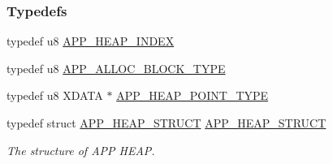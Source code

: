 \subsubsection*{Typedefs}
\begin{DoxyCompactItemize}
\item 
typedef u8 \hyperlink{group___h_e_a_p_gac92ab72831cd0fc218a7529be207c778}{A\+P\+P\+\_\+\+H\+E\+A\+P\+\_\+\+I\+N\+D\+EX}
\item 
typedef u8 \hyperlink{group___h_e_a_p_ga2b37dbe3b78e682f59bb6d1aeb58f508}{A\+P\+P\+\_\+\+A\+L\+L\+O\+C\+\_\+\+B\+L\+O\+C\+K\+\_\+\+T\+Y\+PE}
\item 
typedef u8 X\+D\+A\+TA $\ast$ \hyperlink{group___h_e_a_p_gac8090ae7433e9fda501dd91e26c7f66e}{A\+P\+P\+\_\+\+H\+E\+A\+P\+\_\+\+P\+O\+I\+N\+T\+\_\+\+T\+Y\+PE}
\item 
typedef struct \hyperlink{struct_a_p_p___h_e_a_p___s_t_r_u_c_t}{A\+P\+P\+\_\+\+H\+E\+A\+P\+\_\+\+S\+T\+R\+U\+CT} \hyperlink{group___h_e_a_p_gab1b2f6211e41b3cfd2b3a270afa198f1}{A\+P\+P\+\_\+\+H\+E\+A\+P\+\_\+\+S\+T\+R\+U\+CT}\hypertarget{group___h_e_a_p_gab1b2f6211e41b3cfd2b3a270afa198f1}{}\label{group___h_e_a_p_gab1b2f6211e41b3cfd2b3a270afa198f1}

\begin{DoxyCompactList}\small\item\em The structure of A\+PP H\+E\+AP. \end{DoxyCompactList}\end{DoxyCompactItemize}
